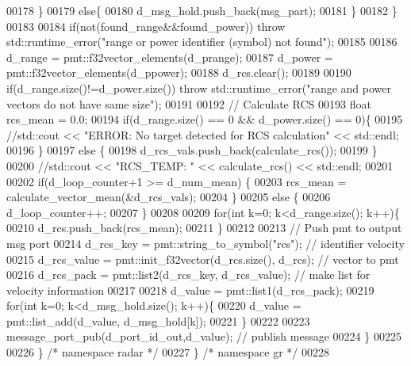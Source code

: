 \begin{DoxyCode}
00178           \}
00179           \textcolor{keywordflow}{else}\{
00180             d_msg_hold.push\_back(msg\_part);
00181           \}
00182         \}
00183 
00184         \textcolor{keywordflow}{if}(not(found\_range&&found\_power)) \textcolor{keywordflow}{throw} std::runtime\_error(\textcolor{stringliteral}{"range or power identifier (symbol) not
       found"});
00185 
00186         d_range = pmt::f32vector\_elements(d_prange);
00187         d_power = pmt::f32vector\_elements(d_ppower);
00188         d_rcs.clear();
00189 
00190         \textcolor{keywordflow}{if}(d_range.size()!=d_power.size()) \textcolor{keywordflow}{throw} std::runtime\_error(\textcolor{stringliteral}{"range and power vectors do not have
       same size"});
00191 
00192         \textcolor{comment}{// Calculate RCS}
00193         \textcolor{keywordtype}{float} rcs\_mean = 0.0;
00194         \textcolor{keywordflow}{if}(d_range.size() == 0 && d_power.size() == 0)\{
00195           \textcolor{comment}{//std::cout << "ERROR: No target detected for RCS calculation" << std::endl;}
00196         \}
00197         \textcolor{keywordflow}{else} \{
00198           d_rcs_vals.push\_back(calculate_rcs());
00199         \}
00200         \textcolor{comment}{//std::cout << "RCS\_TEMP: " << calculate\_rcs() << std::endl;}
00201 
00202         \textcolor{keywordflow}{if}(d_loop_counter+1 >= d_num_mean) \{
00203             rcs\_mean = calculate_vector_mean(&d_rcs_vals);
00204         \}
00205         \textcolor{keywordflow}{else} \{
00206             d_loop_counter++;
00207         \}
00208 
00209         \textcolor{keywordflow}{for}(\textcolor{keywordtype}{int} k=0; k<d_range.size(); k++)\{
00210             d_rcs.push\_back(rcs\_mean);
00211         \}
00212         
00213         \textcolor{comment}{// Push pmt to output msg port}
00214         d_rcs_key = pmt::string\_to\_symbol(\textcolor{stringliteral}{"rcs"}); \textcolor{comment}{// identifier velocity}
00215         d_rcs_value = pmt::init\_f32vector(d_rcs.size(), d_rcs); \textcolor{comment}{// vector to pmt}
00216         d_rcs_pack = pmt::list2(d_rcs_key, d_rcs_value); \textcolor{comment}{// make list for velocity information}
00217         
00218         d_value = pmt::list1(d\_rcs\_pack);
00219         \textcolor{keywordflow}{for}(\textcolor{keywordtype}{int} k=0; k<d_msg_hold.size(); k++)\{
00220             d_value = pmt::list\_add(d_value, d_msg_hold[k]);
00221         \}
00222         
00223         message\_port\_pub(d_port_id_out,d_value); \textcolor{comment}{// publish message}
00224     \}
00225 
00226   \} \textcolor{comment}{/* namespace radar */}
00227 \} \textcolor{comment}{/* namespace gr */}
00228 
\end{DoxyCode}
